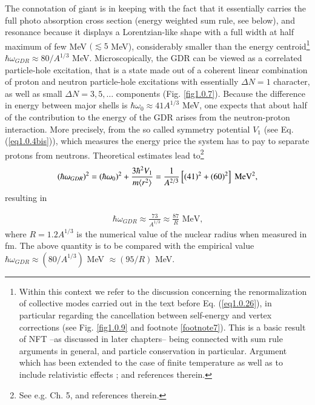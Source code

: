 The connotation of giant is in keeping with the fact that it essentially carries the full photo absorption cross section (energy weighted sum rule, see below), and resonance because it displays a Lorentzian-like shape with a full width at half maximum of few MeV $(\lesssim5$ MeV), considerably  smaller than the energy centroid\footnote{Within this context we refer to the discussion concerning the renormalization of collective modes carried out in the text before Eq. (\ref{eq1.0.26}), in particular regarding the cancellation between self-energy and vertex corrections (see Fig. \ref{fig1.0.9} and footnote \ref{footnote7}). This is a basic result of NFT --as discussed in later chapters-- being connected with sum rule arguments in general, and particle conservation in particular. Argument which has been extended to the case of finite temperature as well as to include relativistic effects \cite{Ward:50,Nambu:60,Bortignon:81,Bertsch:83,Bortignon:98,Litvinova:18,Wibowo:19}; \cite{Lalazissis:19} and references therein.} $\hbar\omega_{GDR}\approx80/A^{1/3}$ MeV. Microscopically, the GDR can be viewed as a correlated particle-hole excitation, that is a state made out of a coherent linear combination of proton and neutron particle-hole excitations with essentially $\Delta N=1$ character, as well as small $\Delta N=3,5,\dots$ components (Fig. \ref{fig1.0.7}). Because the difference in energy between major shells is $\hbar\omega_0\approx41A^{1/3}$ MeV, one expects that about half of the contribution to the energy of the GDR arises from the neutron-proton interaction. More precisely, from the so called  symmetry potential $V_1$ (see Eq.  (\ref{eq1.0.4bis})), which measures the energy price the system has to pay to separate protons from neutrons. Theoretical estimates lead to\footnote{See e.g. \cite{Bertsch:05} Ch. 5, and references therein.} 
\begin{align}\label{eq0.1.106}
(\hbar\omega_{GDR})^2=(\hbar\omega_0)^2+\frac{3\hbar^2V_1}{m\langle {r^2} \rangle}=\frac{1}{A^{2/3}}\left[(41)^2+(60)^2\right]\text{ MeV}^2,
\end{align}
resulting in

\begin{align}\label{eq0.1.107}
\hbar\omega_{GDR}\approx\frac{73}{A^{1/3}}\approx\frac{87}{R}\text{ MeV,}
\end{align}
where $R=1.2A^{1/3}$ is the numerical value of the nuclear radius when measured in fm. The above quantity is to be compared with the empirical value $\hbar\omega_{GDR}\approx(80/A^{1/3})$ MeV $\approx(95/R)$ MeV.

